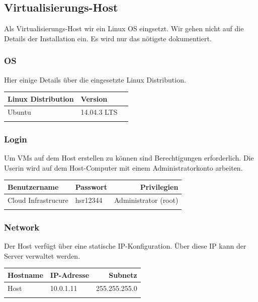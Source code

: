 \documentclass[a4,12pt]{scrartcl}
\begin{document}
\subsection{Virtualisierungs-Host}
Als Virtualisierungs-Host wir ein Linux OS eingsetzt. Wir gehen nicht auf die Details der Installation ein. Es wird nur das nötigste dokumentiert.  

\subsubsection{OS} 
Hier einige Details über die eingesetzte Linux Distribution. 
\begin{center}
    \begin{tabular}{@{} l l r@{}}\toprule    
    {Linux Distribution} & {Version}\\ \midrule
    Ubuntu & 14.04.3 LTS\\ \addlinespace
    \bottomrule
    \end{tabular}
\end{center}

\subsubsection{Login}
Um VMs auf dem Host erstellen zu können sind Berechtigungen erforderlich. Die Userin wird auf dem Host-Computer mit einem Administratorkonto arbeiten. 
\begin{center}
    \begin{tabular}{@{} l l r@{}}\toprule    
    {Benutzername} & {Passwort} & {Privilegien}\\ \midrule
    Cloud Infrastrucure & hsr12344 & Administrator (root)\\ \addlinespace
    \bottomrule
    \end{tabular}
\end{center}

\subsubsection{Network}
Der Host verfügt über eine statische IP-Konfiguration. Über diese IP kann der Server verwaltet werden. 
\begin{center}
    \begin{tabular}{@{} l l r@{}}\toprule    
    {Hostname} & {IP-Adresse} & {Subnetz}\\ \midrule
    Host & 10.0.1.11 & 255.255.255.0\\ \addlinespace
    \bottomrule
    \end{tabular}
\end{center}
\end{document}
